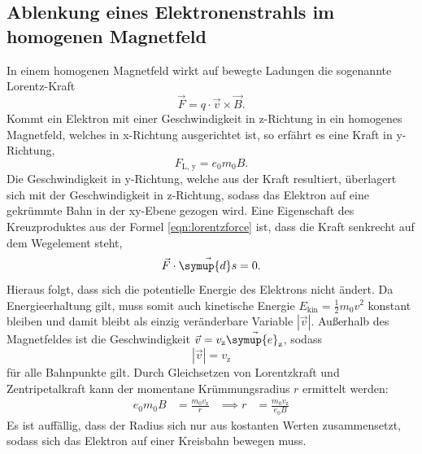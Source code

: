 \subsection{Ablenkung eines Elektronenstrahls im homogenen Magnetfeld}

    In einem homogenen Magnetfeld wirkt auf bewegte Ladungen die sogenannte Lorentz-Kraft 
    \begin{equation} \label{eqn:lorentzforce}
        \vec{F} = q\cdot \vec{v} \times \vec{B}.
    \end{equation}
    Kommt ein Elektron mit einer Geschwindigkeit in z-Richtung in ein homogenes Magnetfeld, welches in x-Richtung ausgerichtet ist, so erfährt es eine Kraft in y-Richtung, 
    \begin{equation*}
        F_{\text{L, y}} = e_0 m_0 B.
    \end{equation*}
    Die Geschwindigkeit in y-Richtung, welche aus der Kraft resultiert, überlagert sich mit der Geschwindigkeit in z-Richtung, sodass das Elektron auf eine gekrümmte Bahn in der 
    xy-Ebene gezogen wird. Eine Eigenschaft des Kreuzproduktes aus der Formel \eqref{eqn:lorentzforce} ist, dass die Kraft senkrecht auf dem Wegelement steht,
    \begin{equation*}
        \vec{F} \cdot \vec{\symup{d}s} = 0.
    \end{equation*}
    Hieraus folgt, dass sich die potentielle Energie des Elektrons nicht ändert. Da Energieerhaltung gilt, muss somit auch kinetische Energie $E_{\text{kin}} = \frac{1}{2} m_0 v^2$
    konstant bleiben und damit bleibt als einzig veränderbare Variable $|\vec{v}|$. Außerhalb des Magnetfeldes ist die Geschwindigkeit $\vec{v} = v_{\text{z}} \vec{\symup{e}_{\text{z}}}$, sodass 
    \begin{equation*}
        |\vec{v}| = v_{\text{z}}
    \end{equation*}
    für alle Bahnpunkte gilt. Durch Gleichsetzen von Lorentzkraft und Zentripetalkraft kann der momentane Krümmungsradius $r$ ermittelt werden:
    \begin{align} \label{eqn:r}
        e_0 m_0 B &= \frac{m_0 v_{\text{z}}}{r} &\implies r &= \frac{m_0 v_{\text{z}}}{e_0 B}
    \end{align}
    Es ist auffällig, dass der Radius sich nur aus kostanten Werten zusammensetzt, sodass sich das Elektron auf einer Kreisbahn bewegen muss. \\

